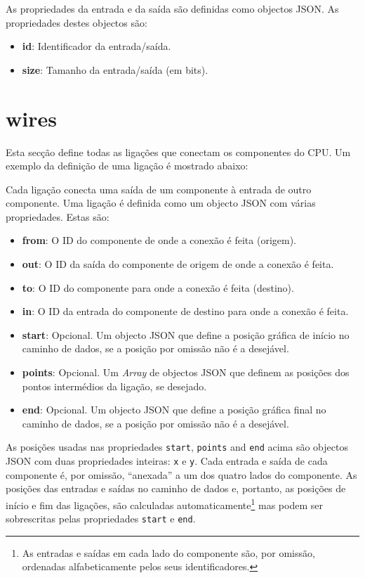 \documentclass[11pt,a4paper,twoside,titlepage]{report}
\begin{document}
As propriedades da entrada e da saída são definidas como objectos JSON.
As propriedades destes objectos são:
\begin{itemize}
	\item \textbf{id}: Identificador da entrada/saída.
	\item \textbf{size}: Tamanho da entrada/saída (em bits).
\end{itemize}


\section{wires}

Esta secção define todas as ligações que conectam os componentes do CPU.
Um exemplo da definição de uma ligação é mostrado abaixo:



Cada ligação conecta uma saída de um componente à entrada de outro componente.
Uma ligação é definida como um objecto JSON com várias propriedades.
Estas são:

\begin{itemize}
	\item \textbf{from}: O ID do componente de onde a conexão é feita (origem).
	\item \textbf{out}: O ID da saída do componente de origem de onde a conexão é
		feita.
	\item \textbf{to}: O ID do componente para onde a conexão é feita (destino).
	\item \textbf{in}: O ID da entrada do componente de destino para onde a conexão
		é feita.
	\item \textbf{start}: Opcional. Um objecto JSON que define a posição gráfica
		de início no caminho de dados, se a posição por omissão não é a desejável.
	\item \textbf{points}: Opcional. Um \emph{Array} de objectos JSON que definem
		as posições dos pontos intermédios da ligação, se desejado.
	\item \textbf{end}: Opcional. Um objecto JSON que define a posição gráfica
		final no caminho de dados, se a posição por omissão não é a desejável.
\end{itemize}

As posições usadas nas propriedades \verb+start+, \verb+points+ and \verb+end+
acima são objectos JSON com duas propriedades inteiras: \verb+x+ e \verb+y+.
Cada entrada e saída de cada componente é, por omissão, ``anexada'' a um dos
quatro lados do componente.
As posições das entradas e saídas no caminho de dados e, portanto, as posições
de início e fim das ligações, são calculadas automaticamente\footnote{As
entradas e saídas em cada lado do componente são, por omissão, ordenadas
alfabeticamente pelos seus identificadores.} mas podem ser sobrescritas pelas
propriedades \verb+start+ e \verb+end+.
\end{document}
